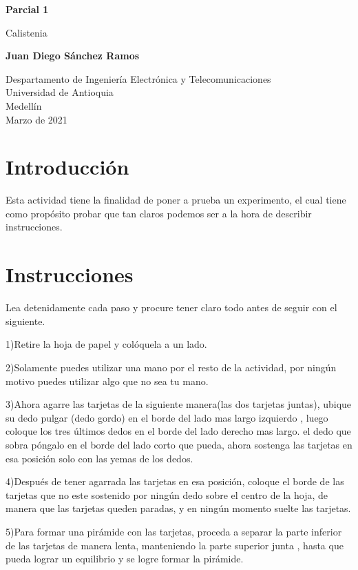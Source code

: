 \documentclass{article}
\begin{document}
\begin{titlepage}
    \begin{center}
        \vspace*{1cm}
            
        \Huge
        \textbf{  Parcial 1  }
            
        \vspace{0.5cm}
        \LARGE
    Calistenia
            
        \vspace{1.5cm}
            
        \textbf{Juan Diego Sánchez Ramos}
            
        \vfill
            
        \vspace{0.8cm}
            
        \Large
        Despartamento de Ingeniería Electrónica y Telecomunicaciones\\
        Universidad de Antioquia\\
        Medellín\\
        Marzo de 2021
            
    \end{center}
\end{titlepage}

\tableofcontents
\newpage
\section{Introducción}\label{intro}
Esta actividad tiene la finalidad de poner a prueba un experimento, el cual tiene como propósito probar que tan claros podemos ser a la hora de describir instrucciones. 
\newpage

\section{Instrucciones}\label{contenido}
Lea detenidamente cada paso y procure tener claro todo antes de seguir con el siguiente.

1)Retire la hoja de papel y colóquela a un lado.

2)Solamente puedes utilizar una mano por el resto de la actividad, por ningún motivo puedes utilizar algo que no sea tu mano.

3)Ahora agarre las tarjetas de la siguiente manera(las dos tarjetas juntas), ubique su dedo pulgar (dedo gordo) en el borde del lado mas largo izquierdo , luego coloque los tres últimos dedos en el borde del lado derecho mas largo. el dedo que sobra póngalo en el borde del lado corto que pueda, ahora sostenga las tarjetas en esa posición solo con las yemas de los dedos.

4)Después de tener agarrada las tarjetas en esa posición, coloque el borde de las tarjetas que no este sostenido por ningún dedo sobre el centro de la hoja, de manera que las tarjetas queden paradas, y en ningún momento suelte las tarjetas.

5)Para formar una pirámide con las tarjetas, proceda a separar la parte inferior de las tarjetas  de manera lenta, manteniendo la parte superior junta , hasta que pueda lograr un equilibrio y se logre formar la pirámide.
\end{document}
